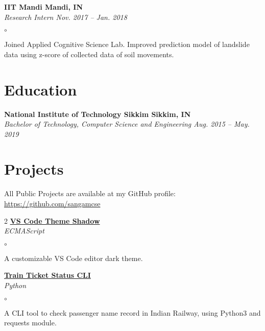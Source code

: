 \documentclass[margin,line]{resume}
\begin{document}
\begin{resume}
    \textbf{IIT Mandi                                                                          \hfill    Mandi, IN} \\%
    \emph{Research Intern                                                           \hfill    Nov. 2017 -- Jan. 2018} %
    \begin{list}{$\circ$}{}
        \item Joined Applied Cognitive Science Lab. Improved prediction model of landslide data using z-score of      %
              collected data of soil movements.
    \end{list}

    \section{\mysidestyle Education}

    \textbf{National Institute of Technology Sikkim                                           \hfill    Sikkim, IN} \\%
    \emph{Bachelor of Technology, Computer Science and Engineering                   \hfill    Aug. 2015 -- May. 2019}%

    \section{\mysidestyle Projects}
    All Public Projects are available at my GitHub profile: \url{https://github.com/sangamcse}                        %
    \vspace{-3mm}
    \begin{multicols}{2}
        \textbf{\href{https://github.com/sangamcse/theme-shadow-vscode}{VS Code Theme Shadow}}                      \\%
        \emph{ECMAScript}
        \begin{list}{$\circ$}{}
            \item A customizable VS Code editor dark theme.
        \end{list}

        \textbf{\href{https://github.com/sangamcse/myPNRStatus}{Train Ticket Status CLI}}                           \\%
        \emph{Python}
        \begin{list}{$\circ$}{}
            \item A CLI tool to check passenger name record in Indian Railway, using Python3 and requests module.     %
        \end{list}


\end{multicols}
\end{resume}
\end{document}
